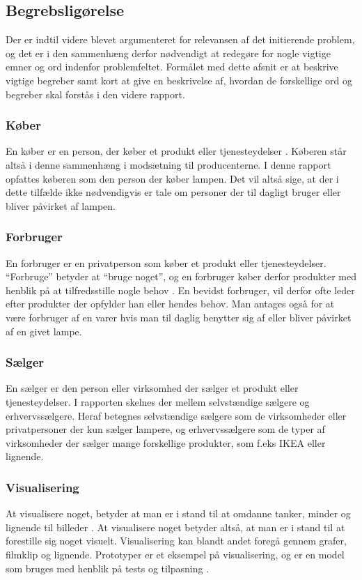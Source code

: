 \subsection{Begrebsligørelse}

Der er indtil videre blevet  argumenteret for relevansen af det initierende problem, og det er i den sammenhæng derfor nødvendigt at redegøre for nogle vigtige emner og ord indenfor problemfeltet. Formålet med dette afsnit er at beskrive vigtige begreber samt kort at give en beskrivelse af, hvordan de forskellige ord og begreber skal forstås i den videre rapport.

\subsubsection{Køber}
En køber er en person, der køber et produkt eller tjenesteydelser \cite{ddo_forbruger}.  Køberen står altså i denne sammenhæng i modsætning til producenterne.
I denne rapport opfattes køberen som den person der køber lampen. Det vil altså sige, at der i dette tilfælde ikke nødvendigvis er tale om personer der til dagligt bruger eller bliver påvirket af lampen.

\subsubsection{Forbruger}
En forbruger er en privatperson som køber et produkt eller tjenesteydelser. “Forbruge” betyder at “bruge noget”, og en forbruger køber derfor produkter med henblik på at tilfredsstille nogle behov \cite{forbrugerportalen}. En bevidst forbruger, vil derfor ofte leder efter produkter der opfylder han eller hendes behov. Man antages også for at være forbruger af en varer hvis man til daglig benytter sig af eller bliver påvirket af en givet  lampe.

\subsubsection{Sælger}
En sælger er den person eller virksomhed der sælger et produkt eller tjenesteydelser. I rapporten skelnes der mellem selvstændige sælgere og erhvervssælgere. Heraf betegnes selvstændige sælgere som de virksomheder eller privatpersoner der kun sælger lampere, og erhvervssælgere som de typer af virksomheder der sælger mange forskellige produkter, som f.eks IKEA eller lignende. 

\subsubsection{Visualisering}
At visualisere noget, betyder at man er i stand til at omdanne tanker, minder og lignende til billeder \cite{ddo_visualisering}. At visualisere noget betyder altså, at man er i stand til at forestille sig noget visuelt. Visualisering kan blandt andet foregå gennem grafer, filmklip og lignende.  
Prototyper er et eksempel på visualisering, og er en model som bruges med henblik på tests og tilpasning \cite{prototyper_pdf}.

